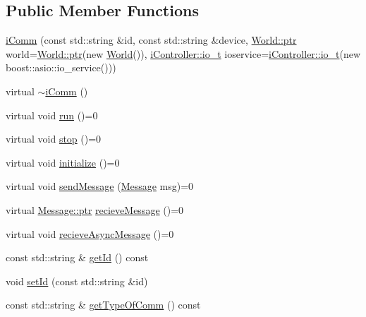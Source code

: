 \subsection*{Public Member Functions}
\begin{DoxyCompactItemize}
\item 
\hyperlink{classo_cpt_1_1i_comm_aa9570953ad88324fd17c41ddf59516e3}{i\+Comm} (const std\+::string \&id, const std\+::string \&device, \hyperlink{classo_cpt_1_1_world_aa6e591e3096d5de71e0cec9039663d67}{World\+::ptr} world=\hyperlink{classo_cpt_1_1_world_aa6e591e3096d5de71e0cec9039663d67}{World\+::ptr}(new \hyperlink{classo_cpt_1_1_world}{World}()), \hyperlink{classo_cpt_1_1i_controller_a51c3436b03060209f6cd2ddce6df2d0c}{i\+Controller\+::io\+\_\+t} ioservice=\hyperlink{classo_cpt_1_1i_controller_a51c3436b03060209f6cd2ddce6df2d0c}{i\+Controller\+::io\+\_\+t}(new boost\+::asio\+::io\+\_\+service()))
\item 
virtual \hyperlink{classo_cpt_1_1i_comm_a817351ba50112bb3a850ed3098257a11}{$\sim$i\+Comm} ()
\item 
virtual void \hyperlink{classo_cpt_1_1i_comm_a0d15a29fb59dd6a74b56a126d03b9170}{run} ()=0
\item 
virtual void \hyperlink{classo_cpt_1_1i_comm_ad73564bd03146a576aaa37db1a38379f}{stop} ()=0
\item 
virtual void \hyperlink{classo_cpt_1_1i_comm_aeba385b1daaec5e64c5c573424ab8d24}{initialize} ()=0
\item 
virtual void \hyperlink{classo_cpt_1_1i_comm_aed3d4364175d17efc0347b6e954f5aef}{send\+Message} (\hyperlink{structo_cpt_1_1i_comm_1_1_message}{Message} msg)=0
\item 
virtual \hyperlink{structo_cpt_1_1i_comm_1_1_message_ad2ba828ad76f96a30e3898b2609a4c01}{Message\+::ptr} \hyperlink{classo_cpt_1_1i_comm_a054ee0448f0d2773abce97c424c5c20c}{recieve\+Message} ()=0
\item 
virtual void \hyperlink{classo_cpt_1_1i_comm_a27a57fb90cfc9cce21552e8539f08dd7}{recieve\+Async\+Message} ()=0
\item 
const std\+::string \& \hyperlink{classo_cpt_1_1i_comm_a4d7452118307e98a10c5aac88f69ca16}{get\+Id} () const
\item 
void \hyperlink{classo_cpt_1_1i_comm_ada67d85e8ca1c2b7931ab010de60cda7}{set\+Id} (const std\+::string \&id)
\item 
const std\+::string \& \hyperlink{classo_cpt_1_1i_comm_a75b8414ce6c41c5931d9e903ef573031}{get\+Type\+Of\+Comm} () const
\item 

\end{DoxyCompactItemize}
